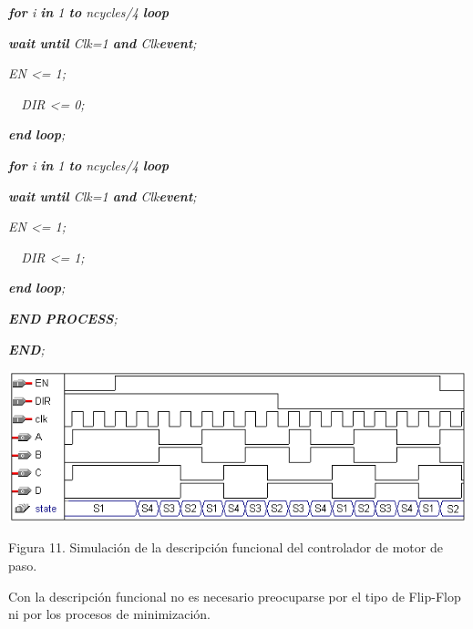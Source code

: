 {\itshape
 \textbf{for} i \textbf{in} 1 \textbf{to} ncycles/4 \textbf{loop}}

{\itshape
 \textbf{wait} \textbf{until} Clk={\textquotesingle}1{\textquotesingle}
\textbf{and} Clk{\textquotesingle}\textbf{event};}

{\itshape
\foreignlanguage{english}{ }\foreignlanguage{spanish}{EN  {\textless}=
{\textquotesingle}1{\textquotesingle};}}

{\itshape
\ \   DIR {\textless}= {\textquotesingle}0{\textquotesingle};}

{\itshape
\foreignlanguage{spanish}{
}\foreignlanguage{english}{\textbf{end}}\foreignlanguage{english}{
}\foreignlanguage{english}{\textbf{loop}}\foreignlanguage{english}{; 
\ \  }}

{\itshape
 \textbf{for} i \textbf{in} 1 \textbf{to} ncycles/4 \textbf{loop}}

{\itshape
 \textbf{wait} \textbf{until} Clk={\textquotesingle}1{\textquotesingle}
\textbf{and} Clk{\textquotesingle}\textbf{event};}

{\itshape
\foreignlanguage{english}{ }\foreignlanguage{spanish}{EN  {\textless}=
{\textquotesingle}1{\textquotesingle};}}

{\itshape
\ \   DIR {\textless}= {\textquotesingle}1{\textquotesingle};}

{\itshape
\foreignlanguage{spanish}{
}\foreignlanguage{english}{\textbf{end}}\foreignlanguage{english}{
}\foreignlanguage{english}{\textbf{loop}}\foreignlanguage{english}{; 
}}

{\itshape
 \textbf{END} \textbf{PROCESS};}

{\itshape
\textbf{END};}

 \includegraphics[width=13.286cm,height=4.382cm]{./images/FSM-img11.png} 

{\centering
Figura 11. Simulación de la descripción funcional del controlador de
motor de paso.
\par}

{
Con la descripción funcional no es necesario preocuparse por el tipo de
Flip-Flop ni por los procesos de minimización.}

